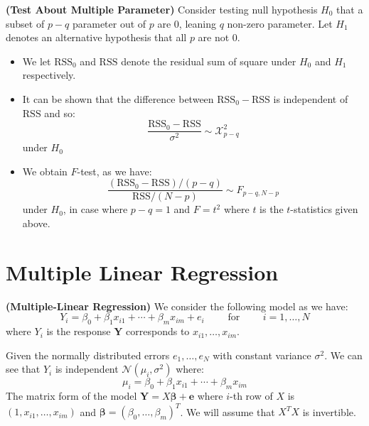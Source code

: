 \begin{remark}{\textbf{(Test About Multiple Parameter)}}
    Consider testing null hypothesis $H_0$ that a subset of $p-q$ parameter out of $p$ are $0$, leaning $q$ non-zero parameter. Let $H_1$ denotes an alternative hypothesis that all $p$ are not $0$. 
    \begin{itemize}
        \item We let $\text{RSS}_0$ and $\text{RSS}$ denote the residual sum of square under $H_0$ and $H_1$ respectively. 
        \item It can be shown that the difference between $\text{RSS}_0-\text{RSS}$ is independent of $\text{RSS}$ and so:
        \begin{equation*}
            \frac{\text{RSS}_0 - \text{RSS}}{\sigma^2}\sim\mathcal{X}^2_{p-q}
        \end{equation*}
        under $H_0$
        \item We obtain $F$-test, as we have:
        \begin{equation*}
            \frac{(\text{RSS}_0 - \text{RSS})/(p-q)}{\text{RSS}/(N-p)} \sim F_{p-q, N-p} 
        \end{equation*}
        under $H_0$, in case where $p-q=1$ and $F=t^2$ where $t$ is the $t$-statistics given above.
    \end{itemize}
\end{remark}

\section{Multiple Linear Regression}

\begin{definition}{\textbf{(Multiple-Linear Regression)}}
   We consider the following model as we have:
   \begin{equation*}
       Y_i = \beta_0 + \beta_1x_{i1} + \cdots + \beta_mx_{im} + e_i \qquad \text{ for } \qquad i = 1,\dots,N
   \end{equation*} 
   where $Y_i$ is the response $\boldsymbol Y$ corresponds to $x_{i1},\dots,x_{im}$. 
\end{definition}

\begin{remark}
    Given the normally distributed errors $e_1,\dots,e_N$ with constant variance $\sigma^2$. We can see that $Y_i$ is independent $\mathcal{N}(\mu_i, \sigma^2)$ where:
   \begin{equation*}
       \mu_i = \beta_0 + \beta_1x_{i1} + \cdots + \beta_{m}x_{im}
   \end{equation*}
   The matrix form of the model $\boldsymbol Y = X\boldsymbol \beta + \boldsymbol e$ where $i$-th row of $X$ is $(1, x_{i1},\dots, x_{im})$ and $\boldsymbol \beta = (\beta_0, \dots, \beta_m)^T$. We will assume that $X^TX$ is invertible.
\end{remark}


